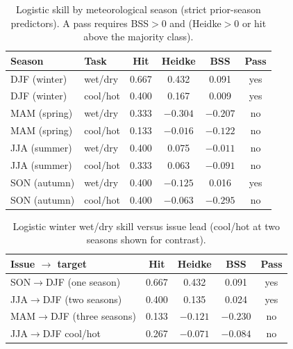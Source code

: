 \documentclass{article}
\begin{document}
\begin{table}[h]
\caption{Logistic skill by meteorological season (strict prior-season predictors). A pass requires BSS$>0$ and (Heidke$>0$ or hit above the majority class).}
\label{tab:multiseason}
\centering
\setlength{\tabcolsep}{3.5pt}
\begin{tabular}{@{}llcccc@{}}
\toprule
\textbf{Season} & \textbf{Task} & \textbf{Hit} & \textbf{Heidke} & \textbf{BSS} & \textbf{Pass} \\
\midrule
DJF (winter) & wet/dry & 0.667 & 0.432 & 0.091 & yes \\
DJF (winter) & cool/hot & 0.400 & 0.167 & 0.009 & yes \\
MAM (spring) & wet/dry & 0.333 & $-0.304$ & $-0.207$ & no \\
MAM (spring) & cool/hot & 0.133 & $-0.016$ & $-0.122$ & no \\
JJA (summer) & wet/dry & 0.400 & 0.075 & $-0.011$ & no \\
JJA (summer) & cool/hot & 0.333 & 0.063 & $-0.091$ & no \\
SON (autumn) & wet/dry & 0.400 & $-0.125$ & 0.016 & yes \\
SON (autumn) & cool/hot & 0.400 & $-0.063$ & $-0.295$ & no \\
\bottomrule
\end{tabular}
\end{table}

\begin{table}[h]
\caption{Logistic winter wet/dry skill versus issue lead (cool/hot at two seasons shown for contrast).}
\label{tab:leads}
\centering
\setlength{\tabcolsep}{3.5pt}
\begin{tabular}{@{}lcccc@{}}
\toprule
\textbf{Issue $\rightarrow$ target} & \textbf{Hit} & \textbf{Heidke} & \textbf{BSS} & \textbf{Pass} \\
\midrule
SON$\rightarrow$DJF (one season) & 0.667 & 0.432 & 0.091 & yes \\
JJA$\rightarrow$DJF (two seasons) & 0.400 & 0.135 & 0.024 & yes \\
MAM$\rightarrow$DJF (three seasons) & 0.133 & $-0.121$ & $-0.230$ & no \\
JJA$\rightarrow$DJF cool/hot & 0.267 & $-0.071$ & $-0.084$ & no \\
\bottomrule
\end{tabular}
\end{table}
\end{document}
